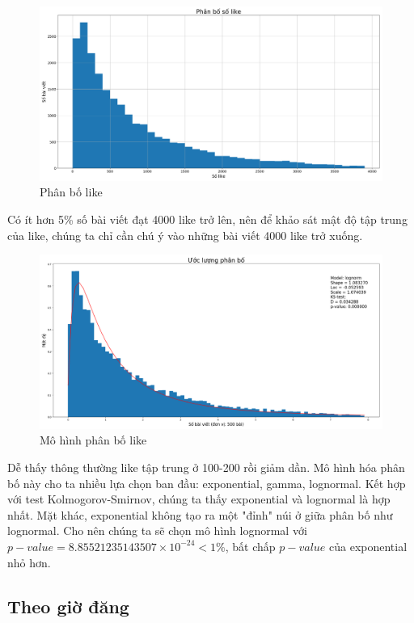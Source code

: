 \documentclass[10pt,a4paper]{article}
\begin{document}
\begin{figure}[!ht]
    \centering
    \includegraphics[width=\textwidth]{img/LikesDistribution.png}
    \caption{Phân bố like}
    \label{fig:likesdistribution}
\end{figure}

Có ít hơn 5\% số bài viết đạt 4000 like trở lên, nên để khảo sát mật độ tập trung của like, chúng ta chỉ cần chú ý vào những bài viết 4000 like trở xuống.

\begin{figure}[!h]
    \centering
    \includegraphics[width=\textwidth]{img/FitLikesDistribution.png}
    \caption{Mô hình phân bố like}
    \label{fig:fitlikesdistribution}
\end{figure}
Dễ thấy thông thường like tập trung ở 100-200 rồi giảm dần. Mô hình hóa phân bố này cho ta nhiều lựa chọn ban đầu: exponential, gamma, lognormal. Kết hợp với test Kolmogorov-Smirnov, chúng ta thấy exponential và lognormal là hợp nhất. Mặt khác, exponential không tạo ra một "đỉnh" núi ở giữa phân bố như lognormal. Cho nên chúng ta sẽ chọn mô hình lognormal với $p-value = 8.85521235143507 \times 10^{-24} < 1\%$, bất chấp $p-value$ của exponential nhỏ hơn.

\subsection{Theo giờ đăng}
\end{document}
